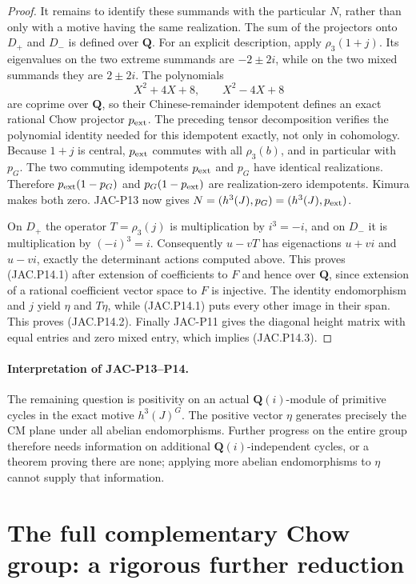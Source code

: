 \documentclass[11pt,a4paper]{article}
\begin{document}
\begin{proof}
It remains to identify these summands with the particular $N$,
rather than only with a motive having the same realization.
The sum of the projectors onto $D_+$ and $D_-$ is defined over
$\mathbf Q$. For an explicit description, apply $\rho_3(1+j)$.
Its eigenvalues on the two extreme summands are $-2\pm2i$,
while on the two mixed summands they are $2\pm2i$.
The polynomials
\[
 X^2+4X+8,\qquad X^2-4X+8
\]
are coprime over $\mathbf Q$, so their Chinese-remainder
idempotent defines an exact rational Chow projector $p_{\rm ext}$.
The preceding tensor decomposition verifies the polynomial
identity needed for this idempotent exactly, not only in cohomology.
Because $1+j$ is central, $p_{\rm ext}$ commutes with all
$\rho_3(b)$, and in particular with $p_G$.
The two commuting idempotents $p_{\rm ext}$ and $p_G$ have
identical realizations. Therefore
$p_{\rm ext}(1-p_G)$ and $p_G(1-p_{\rm ext})$ are
realization-zero idempotents. Kimura makes both zero.
JAC-P13 now gives $N=(h^3(J),p_G)=(h^3(J),p_{\rm ext})$.

On $D_+$ the operator $T=\rho_3(j)$ is multiplication by
$i^3=-i$, and on $D_-$ it is multiplication by $(-i)^3=i$.
Consequently $u-vT$ has eigenactions $u+vi$ and $u-vi$,
exactly the determinant actions computed above. This proves
(JAC.P14.1) after extension of coefficients to $F$ and hence over
$\mathbf Q$, since extension of a rational coefficient vector
space to $F$ is injective.
The identity endomorphism and $j$ yield $\eta$ and $T\eta$,
while (JAC.P14.1) puts every other image in their span.
This proves (JAC.P14.2). Finally JAC-P11 gives the diagonal
height matrix with equal entries and zero mixed entry, which
implies (JAC.P14.3).
\end{proof}

\paragraph{Interpretation of JAC-P13--P14.}
The remaining question is positivity on an actual
$\mathbf Q(i)$-module of primitive cycles in the exact motive
$h^3(J)^G$. The positive vector $\eta$ generates precisely the
CM plane under all abelian endomorphisms. Further progress on
the entire group therefore needs information on additional
$\mathbf Q(i)$-independent cycles, or a theorem proving there
are none; applying more abelian endomorphisms to $\eta$ cannot
supply that information.


\section{The full complementary Chow group: a rigorous further
reduction}\label{the-full-complementary-chow-group-a-rigorous-further-reduction}
\end{document}
